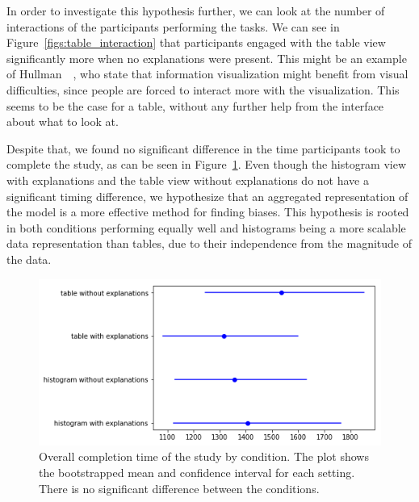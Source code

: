 In order to investigate this hypothesis further, we can look at the number of interactions of the participants performing the tasks.
We can see in Figure~\ref{figs:table_interaction} that participants engaged with the table view significantly more when no explanations were present.
This might be an example of Hullman~\etal~\cite{6064986}, who state that information visualization might benefit from visual difficulties, since people are forced to interact more with the visualization. This seems to be the case for a table, without any further help from the interface about what to look at.

Despite that, we found no significant difference in the time participants took to complete the study, as can be seen in Figure~\ref{figs:timing}.
Even though the histogram view with explanations and the table view without explanations do not have a significant timing difference, we hypothesize that an aggregated representation of the model is a more effective method for finding biases.
This hypothesis is rooted in both conditions performing equally well and histograms being a more scalable data representation than tables, due to their independence from the magnitude of the data.

\begin{figure}
\centering
\includegraphics[width=0.5\linewidth]{aggexplain/stats/timings}
\caption[Overall completion time of the study by condition.]{
Overall completion time of the study by condition.
The plot shows the bootstrapped mean and confidence interval for each setting.
There is no significant difference between the conditions.
}
\label{figs:timing}
\end{figure}

